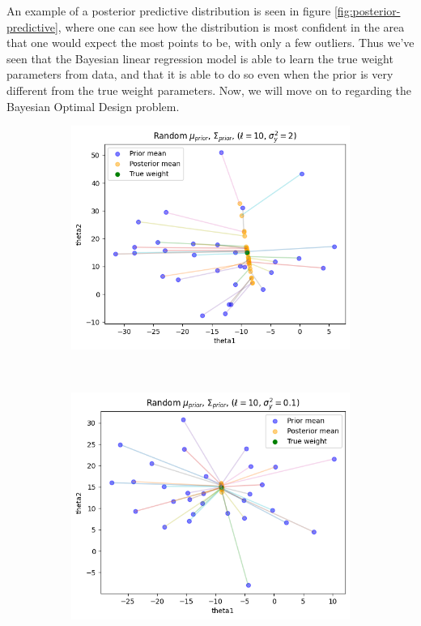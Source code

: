 An example of a posterior predictive distribution is seen in figure \ref{fig:posterior-predictive}, where one can see how the distribution is most confident in the area that one would expect the most points to be, with only a few outliers.
Thus we've seen that the Bayesian linear regression model is able to learn the true weight parameters from data, and that it is able to do so even when the prior is very different from the true weight parameters. Now, we will move on to regarding the Bayesian Optimal Design problem.
\begin{figure}[H]
\centering
\begin{subfigure}{.5\textwidth}
  \includegraphics[width=1\textwidth]{assets/week1/random-priors-new-few.png}
\end{subfigure}\\
\begin{subfigure}{.5\textwidth}
  \includegraphics[width=1\textwidth]{assets/week1/random-priors-new-few-accurate.png}

\end{subfigure}
\end{figure}

